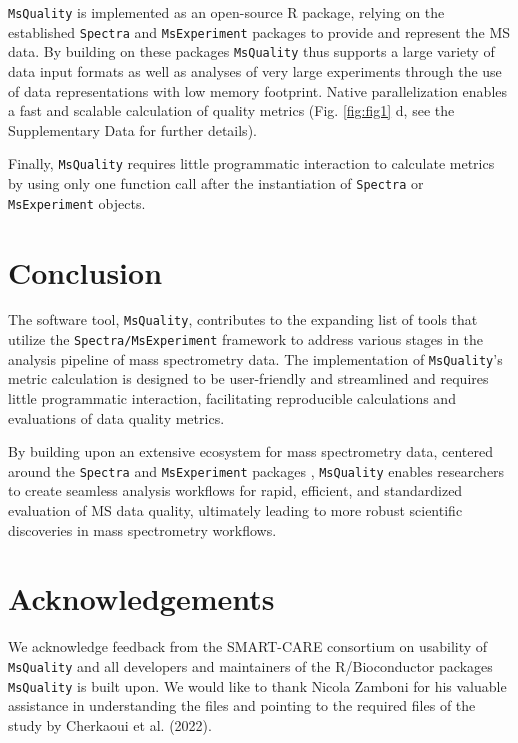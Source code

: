 \documentclass{bioinfo}
\begin{document}
\texttt{MsQuality} is implemented as an open-source R package, relying on the
established \texttt{Spectra} and \texttt{MsExperiment} packages
\citep{Rainer2022} to provide and represent the MS data. By building on these
packages \texttt{MsQuality} thus supports a large variety of data input formats
as well as analyses of very large experiments through the use of data
representations with low memory footprint. Native parallelization enables a fast
and scalable calculation of quality metrics (Fig. \ref{fig:fig1} d, 
see the Supplementary Data for further details).

Finally, \texttt{MsQuality} requires little programmatic interaction to calculate metrics 
by using only one function call after the instantiation of \texttt{Spectra} or 
\texttt{MsExperiment} objects.


\section{Conclusion}

The software tool, \texttt{MsQuality}, contributes to the expanding list of 
tools that utilize the \texttt{Spectra/MsExperiment} framework to address 
various stages in the analysis pipeline of mass spectrometry data.
The implementation of \texttt{MsQuality}'s metric calculation is designed
to be user-friendly and streamlined and requires little programmatic 
interaction, facilitating reproducible calculations and evaluations of data 
quality metrics.

By building upon an extensive ecosystem for mass spectrometry data, centered
around the \texttt{Spectra} and \texttt{MsExperiment} packages \citep{Rainer2022},  
\texttt{MsQuality} enables researchers to create seamless analysis workflows 
for rapid, efficient, and standardized evaluation of MS data quality, 
ultimately leading to more robust scientific discoveries in mass spectrometry
workflows.


\section{Acknowledgements}

We acknowledge feedback from the SMART-CARE consortium on usability of 
\texttt{MsQuality} and all developers and maintainers of the R/Bioconductor 
packages \texttt{MsQuality} is built upon. We would like to thank Nicola Zamboni
for his valuable assistance in understanding the files and pointing to the 
required files of the study by Cherkaoui et al. (2022).
\end{document}
